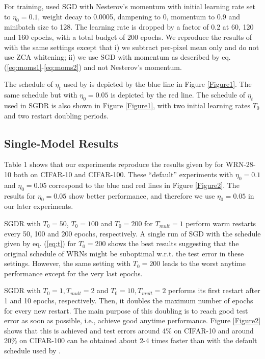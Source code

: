 \documentclass{article}
\begin{document}
For training, \cite{zagoruyko2016wide} used SGD with Nesterov's momentum with initial learning rate set to $\eta_0=0.1$, weight decay to 0.0005, dampening to 0, momentum to 0.9
and minibatch size to 128. 
The learning rate is dropped by a factor of 0.2 at 60, 120 and 160 epochs, with a total budget of 200 epochs. We reproduce the results of \cite{zagoruyko2016wide} with the same settings except that i) we subtract per-pixel mean only and do not use ZCA whitening; ii) we use SGD with momentum as described by eq. (\ref{eq:moms1}-\ref{eq:moms2}) and not Nesterov's momentum. 

The schedule of $\eta_t$ used by \cite{zagoruyko2016wide} is depicted by the blue line in Figure \ref{Figure1}. The same schedule but with $\eta_0=0.05$ is depicted by the red line. 
The schedule of $\eta_t$ used in SGDR is also shown in Figure \ref{Figure1}, with two initial learning rates $T_0$ and two restart doubling periods.

\subsection{Single-Model Results}

Table 1 shows that our experiments reproduce the results given by \cite{zagoruyko2016wide} for WRN-28-10 both on CIFAR-10 and CIFAR-100. These ``default'' experiments 
with $\eta_0=0.1$ and $\eta_0=0.05$ correspond to the blue and red lines in Figure \ref{Figure2}. The results for $\eta_0=0.05$ show better performance, and therefore we use $\eta_0=0.05$ in our later experiments. 

SGDR with $T_0=50$, $T_0=100$ and $T_0=200$ for $T_{mult}=1$   
perform warm restarts every 50, 100 and 200 epochs, respectively. 
 A single run of SGD with the schedule given by eq. (\ref{eq:t}) for $T_0=200$ 
shows the best results suggesting that the original schedule of WRNs 
might be suboptimal w.r.t. the test error in these settings. 
However, the same setting with $T_0=200$ leads to the worst anytime performance except for the very last epochs.  

SGDR with $T_0=1, T_{mult}=2$ and $T_0=10, T_{mult}=2$ 
performs its first restart after 1 and 10 epochs, respectively. 
Then, it doubles the maximum number of epochs for every new restart. 
The main purpose of this doubling is to reach good test error 
as soon as possible, i.e., achieve good anytime performance.   
Figure \ref{Figure2} shows that this is achieved and 
test errors around 4\% on CIFAR-10 and around 20\% on CIFAR-100 
can be obtained about 2-4 times faster than with the default 
schedule used by \cite{zagoruyko2016wide}. 
\end{document}

